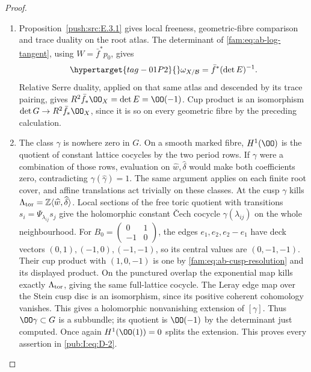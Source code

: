 \begin{proof}
\begin{enumerate}[label=\arabic*.,leftmargin=*]
\item Proposition~\ref{push:src:E.3.1} gives local freeness,
geometric-fibre comparison and trace duality on the root atlas.
The determinant of \eqref{fam:eq:ab-log-tangent}, using $W=\bar f^*p_0$, gives
\begin{equation}
 \hypertarget{tag-01P2}{}\label{fam:eq:ab-relative-dualizing}
\omega_{X/\mathcal B}=\bar f^*(\det E)^{-1}.
\end{equation}
Relative Serre duality, applied on that same atlas and descended by
its trace pairing, gives $R^2\bar f_*\OO_X=\det E=\OO(-1)$.
Cup product is an isomorphism $\det G\to R^2\bar f_*\OO_X$, since it
is so on every geometric fibre by the preceding calculation.

\item The class $\gamma$ is nowhere zero in $G$. On a smooth marked fibre,
$H^1(\OO)$ is the quotient of constant lattice cocycles by the two
period rows. If $\gamma$ were a combination of those rows, evaluation
on $\widehat w,\widehat\delta$ would make both coefficients zero,
contradicting $\gamma(\widehat\gamma)=1$. The same argument applies
on each finite root cover, and affine translations act trivially on
these classes. At the cusp $\gamma$ kills
$\Lambda_{\rm tor}=\mathbb Z\langle\widehat w,\widehat\delta\rangle$.
Local sections of the free toric quotient with transitions
$s_i=\Psi_{\lambda_{ij}}s_j$ give the holomorphic constant \v Cech
cocycle $\gamma(\lambda_{ij})$ on the whole neighbourhood.
For $B_0=\left(\begin{smallmatrix}0&1\\-1&0\end{smallmatrix}\right)$,
the edges $e_1,e_2,e_2-e_1$ have deck vectors
$(0,1),(-1,0),(-1,-1)$, so its central values are $(0,-1,-1)$.
Their cup product with $(1,0,-1)$ is one by
\eqref{fam:eq:ab-cusp-resolution} and its displayed product.
On the punctured overlap the exponential map kills exactly
$\Lambda_{\rm tor}$, giving the same full-lattice cocycle.
The Leray edge map over the Stein cusp disc is an isomorphism,
since its positive coherent cohomology vanishes. This gives
a holomorphic nonvanishing extension of $[\gamma]$.
Thus
$\OO\gamma\subset G$ is a subbundle; its quotient is $\OO(-1)$ by
the determinant just computed. Once again $H^1(\OO(1))=0$ splits the
extension. This proves every assertion in \eqref{pub:I:eq:D-2}.
\end{enumerate}
\end{proof}